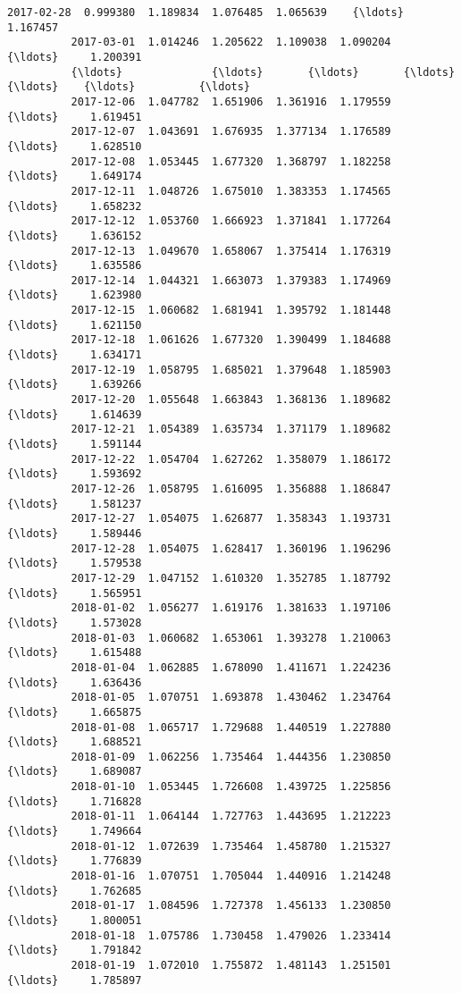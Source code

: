\documentclass[11pt]{article}
\begin{document}
\begin{Verbatim}[commandchars=\\\{\}]
          2017-02-28  0.999380  1.189834  1.076485  1.065639    {\ldots}     1.167457   
          2017-03-01  1.014246  1.205622  1.109038  1.090204    {\ldots}     1.200391   
          {\ldots}              {\ldots}       {\ldots}       {\ldots}       {\ldots}    {\ldots}          {\ldots}   
          2017-12-06  1.047782  1.651906  1.361916  1.179559    {\ldots}     1.619451   
          2017-12-07  1.043691  1.676935  1.377134  1.176589    {\ldots}     1.628510   
          2017-12-08  1.053445  1.677320  1.368797  1.182258    {\ldots}     1.649174   
          2017-12-11  1.048726  1.675010  1.383353  1.174565    {\ldots}     1.658232   
          2017-12-12  1.053760  1.666923  1.371841  1.177264    {\ldots}     1.636152   
          2017-12-13  1.049670  1.658067  1.375414  1.176319    {\ldots}     1.635586   
          2017-12-14  1.044321  1.663073  1.379383  1.174969    {\ldots}     1.623980   
          2017-12-15  1.060682  1.681941  1.395792  1.181448    {\ldots}     1.621150   
          2017-12-18  1.061626  1.677320  1.390499  1.184688    {\ldots}     1.634171   
          2017-12-19  1.058795  1.685021  1.379648  1.185903    {\ldots}     1.639266   
          2017-12-20  1.055648  1.663843  1.368136  1.189682    {\ldots}     1.614639   
          2017-12-21  1.054389  1.635734  1.371179  1.189682    {\ldots}     1.591144   
          2017-12-22  1.054704  1.627262  1.358079  1.186172    {\ldots}     1.593692   
          2017-12-26  1.058795  1.616095  1.356888  1.186847    {\ldots}     1.581237   
          2017-12-27  1.054075  1.626877  1.358343  1.193731    {\ldots}     1.589446   
          2017-12-28  1.054075  1.628417  1.360196  1.196296    {\ldots}     1.579538   
          2017-12-29  1.047152  1.610320  1.352785  1.187792    {\ldots}     1.565951   
          2018-01-02  1.056277  1.619176  1.381633  1.197106    {\ldots}     1.573028   
          2018-01-03  1.060682  1.653061  1.393278  1.210063    {\ldots}     1.615488   
          2018-01-04  1.062885  1.678090  1.411671  1.224236    {\ldots}     1.636436   
          2018-01-05  1.070751  1.693878  1.430462  1.234764    {\ldots}     1.665875   
          2018-01-08  1.065717  1.729688  1.440519  1.227880    {\ldots}     1.688521   
          2018-01-09  1.062256  1.735464  1.444356  1.230850    {\ldots}     1.689087   
          2018-01-10  1.053445  1.726608  1.439725  1.225856    {\ldots}     1.716828   
          2018-01-11  1.064144  1.727763  1.443695  1.212223    {\ldots}     1.749664   
          2018-01-12  1.072639  1.735464  1.458780  1.215327    {\ldots}     1.776839   
          2018-01-16  1.070751  1.705044  1.440916  1.214248    {\ldots}     1.762685   
          2018-01-17  1.084596  1.727378  1.456133  1.230850    {\ldots}     1.800051   
          2018-01-18  1.075786  1.730458  1.479026  1.233414    {\ldots}     1.791842   
          2018-01-19  1.072010  1.755872  1.481143  1.251501    {\ldots}     1.785897   
          

\end{Verbatim}
\end{document}
